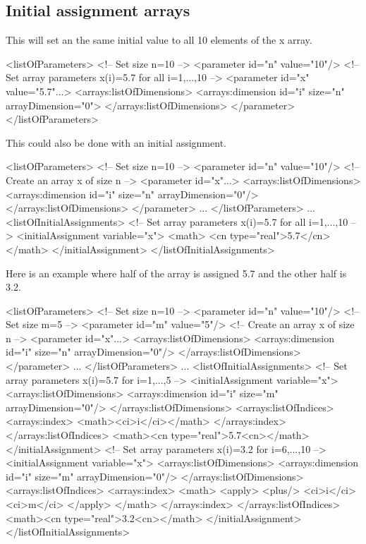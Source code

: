 \subsection{Initial assignment arrays}

This will set an the same initial value to all 10 elements of the x array.

\begin{example}
<listOfParameters>
 <!-- Set size n=10 -->
 <parameter id="n" value="10"/>
 <!-- Set array parameters x(i)=5.7 for all i=1,...,10 -->
 <parameter id="x" value="5.7"...>
  <arrays:listOfDimensions>
   <arrays:dimension id="i" size="n" arrayDimension="0">
  </arrays:listOfDimensions> 
 </parameter>
</listOfParameters>
\end{example}

This could also be done with an initial assignment.

\begin{example}
<listOfParameters> 
 <!-- Set size n=10 -->
 <parameter id="n" value="10"/>
 <!-- Create an array x of size n -->
 <parameter id="x"...>
  <arrays:listOfDimensions>
   <arrays:dimension id="i" size="n" arrayDimension="0"/> 
  </arrays:listOfDimensions>
 </parameter> ...
</listOfParameters> ...
<listOfInitialAssignments>
 <!-- Set array parameters x(i)=5.7 for all i=1,...,10 -->
 <initialAssignment variable="x">
  <math>
   <cn type="real">5.7</cn>
  </math>
 </initialAssignment>
</listOfInitialAssignments>
\end{example}

Here is an example where half of the array is assigned 5.7 and the other half is 3.2. 

\begin{example}
<listOfParameters> 
 <!-- Set size n=10 -->
 <parameter id="n" value="10"/>
 <!-- Set size m=5 -->
 <parameter id="m" value="5"/>
 <!-- Create an array x of size n -->
 <parameter id="x"...>
  <arrays:listOfDimensions>
   <arrays:dimension id="i" size="n" arrayDimension="0"/> 
  </arrays:listOfDimensions>
 </parameter> ...
</listOfParameters> ...
<listOfInitialAssignments>
 <!-- Set array parameters x(i)=5.7 for i=1,...,5 -->
 <initialAssignment variable="x"> 
  <arrays:listOfDimensions>
   <arrays:dimension id="i" size="m" arrayDimension="0"/>
  </arrays:listOfDimensions>
  <arrays:listOfIndices>
   <arrays:index>
    <math><ci>i</ci></math>
   </arrays:index>
  </arrays:listOfIndices>
  <math><cn type="real">5.7<cn></math>
 </initialAssignment>
 <!-- Set array parameters x(i)=3.2 for i=6,...,10 -->
 <initialAssignment variable="x">
  <arrays:listOfDimensions>
   <arrays:dimension id="i" size="m" arrayDimension="0"/>
  </arrays:listOfDimensions>
  <arrays:listOfIndices>
   <arrays:index>
    <math>
     <apply>
       <plus/>
        <ci>i</ci>
        <ci>m</ci>
     </apply>
    </math>
   </arrays:index>
  </arrays:listOfIndices>
  <math><cn type="real">3.2<cn></math>
 </initialAssignment>
</listOfInitialAssignments>
\end{example}

